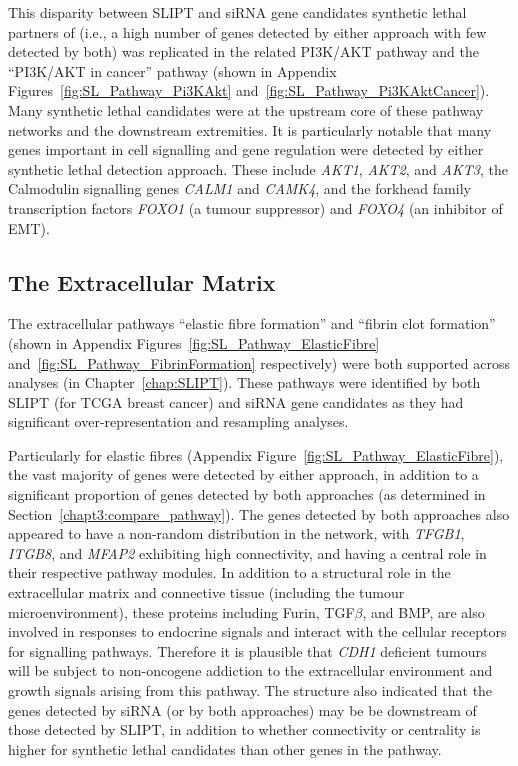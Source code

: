 This disparity between \gls{SLIPT} and \gls{siRNA} gene candidates \gls{synthetic lethal} partners of  (i.e., a high number of genes detected by either approach with few detected by both) was replicated in the related PI3K/AKT \gls{pathway} and the ``PI3K/AKT in cancer'' \gls{pathway} (shown in Appendix Figures~\ref{fig:SL_Pathway_Pi3KAkt} and~\ref{fig:SL_Pathway_Pi3KAktCancer}). Many \gls{synthetic lethal} candidates were at the upstream core of these \gls{pathway} networks and the downstream extremities. It is particularly notable that many genes important in cell signalling and gene regulation were detected by either \gls{synthetic lethal} detection approach. These include \textit{AKT1}, \textit{AKT2}, and \textit{AKT3}, the Calmodulin signalling genes \textit{CALM1} and \textit{CAMK4}, and the forkhead family transcription factors \textit{FOXO1} (a \gls{tumour suppressor}) and \textit{FOXO4} (an inhibitor of \acrshort{EMT}).

\FloatBarrier


\subsection{The Extracellular Matrix}  \label{chapt4:SL_Genes_ECM}

The extracellular \glspl{pathway} ``elastic fibre formation'' and ``fibrin clot formation'' (shown in Appendix Figures~\ref{fig:SL_Pathway_ElasticFibre} and~\ref{fig:SL_Pathway_FibrinFormation} respectively) were both supported across analyses (in Chapter~\ref{chap:SLIPT}). These \glspl{pathway} were identified by both \gls{SLIPT} (for \gls{TCGA} breast cancer) and \gls{siRNA} gene candidates as they had significant over-representation and resampling analyses.


Particularly for elastic fibres (Appendix Figure~\ref{fig:SL_Pathway_ElasticFibre}), the vast majority of genes were detected by either approach, in addition to a significant proportion of genes detected by both approaches (as determined in Section~\ref{chapt3:compare_pathway}). The genes detected by both approaches also appeared to have a non-random distribution in the network, with \textit{TFGB1}, \textit{ITGB8}, and \textit{MFAP2} exhibiting high connectivity, and having a central role in their respective \gls{pathway} modules. In addition to a structural role in the extracellular matrix and connective tissue (including the tumour microenvironment), these proteins including Furin, TGF$\beta$, and BMP, are also involved in responses to endocrine signals and interact with the cellular receptors for signalling \glspl{pathway}. Therefore it is plausible that \textit{CDH1} deficient tumours will be subject to \gls{non-oncogene addiction} to the extracellular environment and growth signals arising from this \gls{pathway}. The  structure also indicated that the genes detected by \gls{siRNA} (or by both approaches) may be be downstream of those detected by \gls{SLIPT}, in addition to whether connectivity or \gls{centrality} is higher for \gls{synthetic lethal} candidates than other genes in the \gls{pathway}.

